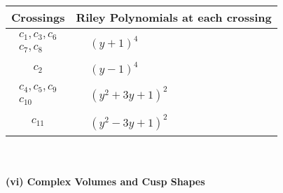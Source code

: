 \documentclass[1p]{elsarticle_modified}
\theoremstyle{definition}
\begin{document}
\begin{tabular}{m{50pt}|m{274pt}}
Crossings & \hspace{64pt}Riley Polynomials at each crossing \\
\hline $$\begin{aligned}c_{1},c_{3},c_{6}\\c_{7},c_{8}\end{aligned}$$&$\begin{aligned}
&(y+1)^4
\end{aligned}$\\
\hline $$\begin{aligned}c_{2}\end{aligned}$$&$\begin{aligned}
&(y-1)^4
\end{aligned}$\\
\hline $$\begin{aligned}c_{4},c_{5},c_{9}\\c_{10}\end{aligned}$$&$\begin{aligned}
&(y^2+3 y+1)^2
\end{aligned}$\\
\hline $$\begin{aligned}c_{11}\end{aligned}$$&$\begin{aligned}
&(y^2-3 y+1)^2
\end{aligned}$\\
\hline
\end{tabular}\\~\\
\newpage\flushleft \textbf{(vi) Complex Volumes and Cusp Shapes}
\end{document}
